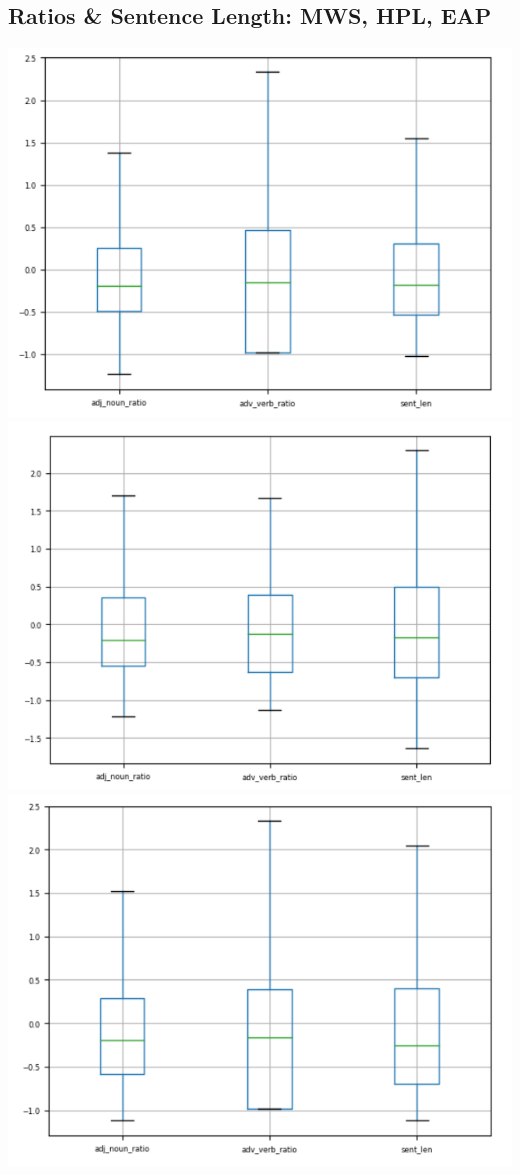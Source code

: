 \documentclass[8pt]{article}
\begin{document}
\subsection{Ratios \& Sentence Length: MWS, HPL, EAP}
\includegraphics[scale=.50, center]{images/ratio_mws.png}
\vskip 0.2in
\includegraphics[scale=.50, center]{images/ratio_hpl.png}
\vskip 0.2in
\includegraphics[scale=.50, center]{images/ratio_eap.png}
\end{document}
